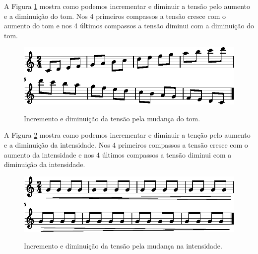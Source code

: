 \begin{example}
A Figura \ref{fig:tension-release-tom-1} mostra como podemos incrementar e diminuir a tensão
pelo aumento e a diminuição do tom. 
Nos 4 primeiros compassos a tensão cresce com o aumento do tom 
e nos 4 últimos compassos a tensão diminui com a diminuição do tom.
\end{example}
\begin{figure}[!h]
     \centering
     \href{https://drive.google.com/file/d/1NYaX1__2IHeMB5fA3Dw2Al8x3fnxwmEv/view?usp=sharing}{\includegraphics[width=1.0\textwidth]{chapters/cap-musica-topicos/tension-release-tom-1.eps}}
     \caption{Incremento e diminuição da tensão pela mudança do tom.}
     \label{fig:tension-release-tom-1}
\end{figure}


\begin{example}
A Figura \ref{fig:tension-release-intensidade-1} mostra como podemos incrementar e diminuir a tenção
pelo aumento e a diminuição da intensidade. 
Nos 4 primeiros compassos a tensão cresce com o aumento da intensidade 
e nos 4 últimos compassos a tensão diminui com a diminuição da intensidade.
\end{example}
\begin{figure}[!h]
     \centering
     \href{https://drive.google.com/file/d/1CjZiHfHHq1hPUmkePC58QQeX4eCX-_fH/view?usp=sharing}{\includegraphics[width=1.0\textwidth]{chapters/cap-musica-topicos/tension-release-intensidade-1.eps}}
     \caption{Incremento e diminuição da tensão pela mudança na intensidade.}
     \label{fig:tension-release-intensidade-1}
\end{figure}



